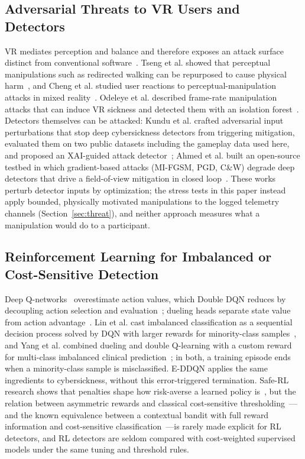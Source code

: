 \subsection{Adversarial Threats to VR Users and Detectors}
VR mediates perception and balance and therefore exposes an attack surface distinct from conventional software~\cite{odeleye2023virtually,giaretta2025security}. Tseng et al. showed that perceptual manipulations such as redirected walking can be repurposed to cause physical harm~\cite{tseng2022dark}, and Cheng et al. studied user reactions to perceptual-manipulation attacks in mixed reality~\cite{cheng2023perceptual}. Odeleye et al. described frame-rate manipulation attacks that can induce VR sickness and detected them with an isolation forest~\cite{odeleye2021framerate}. Detectors themselves can be attacked: Kundu et al. crafted adversarial input perturbations that stop deep cybersickness detectors from triggering mitigation, evaluated them on two public datasets including the gameplay data used here, and proposed an XAI-guided attack detector~\cite{kundu2025securing}; Ahmed et al. built an open-source testbed in which gradient-based attacks (MI-FGSM, PGD, C\&W) degrade deep detectors that drive a field-of-view mitigation in closed loop~\cite{ahmed2025adversarialvr}. These works perturb detector inputs by optimization; the stress tests in this paper instead apply bounded, physically motivated manipulations to the logged telemetry channels (Section~\ref{sec:threat}), and neither approach measures what a manipulation would do to a participant.

\subsection{Reinforcement Learning for Imbalanced or Cost-Sensitive Detection}
Deep Q-networks~\cite{mnih2015human} overestimate action values, which Double DQN reduces by decoupling action selection and evaluation~\cite{vanhasselt2016double}; dueling heads separate state value from action advantage~\cite{wang2016dueling}. Lin et al. cast imbalanced classification as a sequential decision process solved by DQN with larger rewards for minority-class samples~\cite{lin2020imbalanced}, and Yang et al. combined dueling and double Q-learning with a custom reward for multi-class imbalanced clinical prediction~\cite{yang2024drlimbalanced}; in both, a training episode ends when a minority-class sample is misclassified. E-DDQN applies the same ingredients to cybersickness, without this error-triggered termination. Safe-RL research shows that penalties shape how risk-averse a learned policy is~\cite{garcia2015safe}, but the relation between asymmetric rewards and classical cost-sensitive thresholding~\cite{elkan2001cost}---and the known equivalence between a contextual bandit with full reward information and cost-sensitive classification~\cite{dudik2011efficient}---is rarely made explicit for RL detectors, and RL detectors are seldom compared with cost-weighted supervised models under the same tuning and threshold rules.


